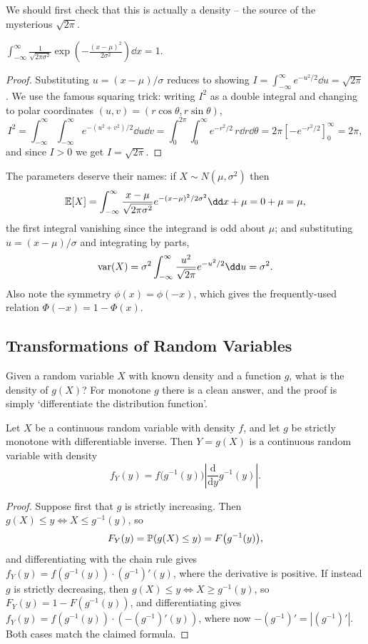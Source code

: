 \documentclass[a4paper]{scrartcl}
\begin{document}
We should first check that this is actually a density -- the source of the mysterious $\sqrt{2\pi}$.

\begin{proposition}
	$\displaystyle\int_{-\infty}^{\infty} \frac{1}{\sqrt{2\pi\sigma^2}} \exp\left(-\frac{(x-\mu)^2}{2\sigma^2}\right)\dd x = 1$.
\end{proposition}
\begin{proof}
	Substituting $u = (x - \mu)/\sigma$ reduces to showing $I = \int_{-\infty}^{\infty} e^{-u^2/2}\dd u = \sqrt{2\pi}$. We use the famous squaring trick: writing $I^2$ as a double integral and changing to polar coordinates $(u, v) = (r\cos\theta, r\sin\theta)$,
	$$
	I^2 = \int_{-\infty}^{\infty}\!\int_{-\infty}^{\infty} e^{-(u^2 + v^2)/2}\dd u \dd v = \int_0^{2\pi}\!\!\int_0^{\infty} e^{-r^2/2}\, r\dd r\dd\theta = 2\pi \left[-e^{-r^2/2}\right]_0^{\infty} = 2\pi,
	$$
	and since $I > 0$ we get $I = \sqrt{2\pi}$.
\end{proof}

The parameters deserve their names: if $X \sim N(\mu, \sigma^2)$ then
$$
\EE[X] = \int_{-\infty}^{\infty} \frac{x - \mu}{\sqrt{2\pi\sigma^2}}e^{-(x - \mu)^2/2\sigma^2}\dd x + \mu = 0 + \mu = \mu,
$$
the first integral vanishing since the integrand is odd about $\mu$; and substituting $u = (x - \mu)/\sigma$ and integrating by parts,
$$
\var(X) = \sigma^2 \int_{-\infty}^{\infty} \frac{u^2}{\sqrt{2\pi}}e^{-u^2/2}\dd u = \sigma^2.
$$
Also note the symmetry $\phi(x) = \phi(-x)$, which gives the frequently-used relation $\Phi(-x) = 1 - \Phi(x)$.

\subsection{Transformations of Random Variables}

Given a random variable $X$ with known density and a function $g$, what is the density of $g(X)$? For monotone $g$ there is a clean answer, and the proof is simply `differentiate the distribution function'.

\begin{theorem}
	Let $X$ be a continuous random variable with density $f$, and let $g$ be strictly monotone with differentiable inverse. Then $Y = g(X)$ is a continuous random variable with density
	$$
	f_Y(y) = f\big(g^{-1}(y)\big) \left|\frac{\mathrm{d}}{\mathrm{d}y} g^{-1}(y)\right|.
	$$
\end{theorem}
\begin{proof}
	Suppose first that $g$ is strictly increasing. Then $g(X) \leq y \iff X \leq g^{-1}(y)$, so
	$$
	F_Y(y) = \mathbb{P}(g(X) \leq y) = F\big(g^{-1}(y)\big),
	$$
	and differentiating with the chain rule gives $f_Y(y) = f(g^{-1}(y)) \cdot (g^{-1})'(y)$, where the derivative is positive. If instead $g$ is strictly decreasing, then $g(X) \leq y \iff X \geq g^{-1}(y)$, so $F_Y(y) = 1 - F(g^{-1}(y))$, and differentiating gives $f_Y(y) = f(g^{-1}(y)) \cdot \left(-(g^{-1})'(y)\right)$, where now $-(g^{-1})' = |(g^{-1})'|$. Both cases match the claimed formula.
\end{proof}
\end{document}
